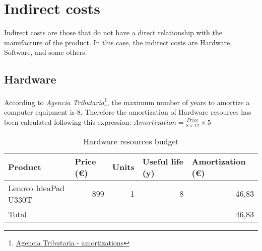 \section{Indirect costs}
Indirect costs are those that do not have a direct relationship with the manufacture of the product. In this case, the indirect costs are Hardware, Software, and some others. 

\subsection{Hardware}

According to \emph{Agencia Tributaria}\footnote{\href{http://www.agenciatributaria.es/AEAT.internet/en_gb/Inicio/_Segmentos_/Empresas_y_profesionales/Empresas/Impuesto_sobre_Sociedades/Periodos_impositivos_a_partir_de_1_1_2015/Base_imponible/Amortizacion/Tabla_de_coeficientes_de_amortizacion_lineal_.shtml} {Agencia Tributaria - amortizations}}, the maximum number of years to amortize a computer equipment is 8. Therefore the amortization of Hardware resources has been calculated following this expression: $Amortization = \frac{Price}{8\times12} \times 5$

\begin{table}[h!]
	\centering
	\begin{tabular}{|l|r|r|r|r|}
		\hline
		Product & \multicolumn{1}{l|}{Price (€)} & \multicolumn{1}{l|}{Units} & \multicolumn{1}{l|}{Useful life (y)} & \multicolumn{1}{l|}{Amortization (€)} \\ \hline
		Lenovo IdeaPad U330T & 899 & 1 & 8 & 46,83\\ \hline\hline
		Total & \multicolumn{4}{r|}{46,83} \\ \hline
	\end{tabular}
	\caption{Hardware resources budget}
	\label{HardwareResources}
\end{table}

